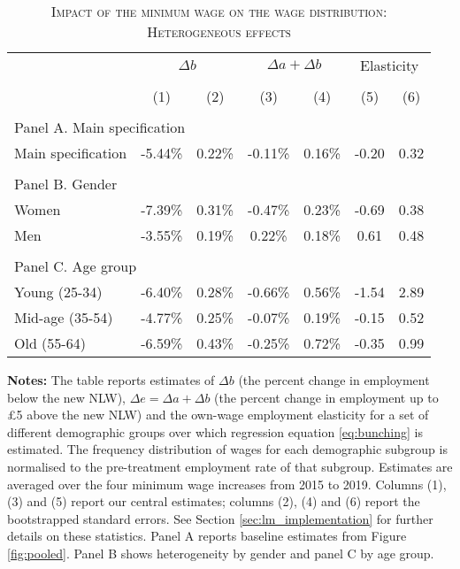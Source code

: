 \begin{table}[pth]
\centering
\small
\caption{\textsc{Impact of the minimum wage on the wage distribution: Heterogeneous effects}}
\label{tab:heterogeneity}
\begin{threeparttable}
\begin{tabular}{lcccccc}
\toprule
 & \multicolumn{2}{c}{$\Delta{b}$} & \multicolumn{2}{c}{$\Delta{a}+\Delta{b}$} & \multicolumn{2}{c}{Elasticity} \\
 &  &  &  &  &  &  \\
 & (1) & (2) & (3) & (4) & (5) & (6) \\
\midrule
& \\
\multicolumn{7}{l}{Panel A. Main specification} \\
Main specification & -5.44\% & 0.22\% & -0.11\% & 0.16\% & -0.20 & 0.32 \\
\\
\multicolumn{7}{l}{Panel B. Gender} \\
Women	&	-7.39\%	& 0.31\%	& 	-0.47\%		& 0.23\%	& 	-0.69	& 	0.38 \\
Men	&	-3.55\%		& 0.19\%	& 	0.22\%	& 	0.18\%	& 	0.61	& 	0.48 \\
\\
\multicolumn{7}{l}{Panel C. Age group} \\
Young (25-34) &	-6.40\%	& 0.28\%  &	-0.66\%	& 0.56\% &	-1.54 &	2.89 \\
Mid-age (35-54)	& -4.77\% &	0.25\%	& -0.07\% &	0.19\% &	-0.15 &	0.52 \\
Old (55-64)	& -6.59\% &	0.43\% &	-0.25\%	 & 0.72\% &	-0.35 &	0.99 \\
\bottomrule
\end{tabular}
\par
\footnotesize{\textbf{Notes:} The table reports estimates of $\Delta b$ (the percent change in employment below the new NLW), $\Delta e = \Delta a + \Delta b$ (the percent change in employment up to \pounds 5 above the new NLW) and the own-wage employment elasticity for a set of different demographic groups over which regression equation \ref{eq:bunching} is estimated. The frequency distribution of wages for each demographic subgroup is normalised to the pre-treatment employment rate of that subgroup. Estimates are averaged over the four minimum wage increases from 2015 to 2019. Columns (1), (3) and (5) report our central estimates; columns (2), (4) and (6) report the bootstrapped standard errors. See Section \ref{sec:lm_implementation} for further details on these statistics. Panel A reports baseline estimates from Figure \ref{fig:pooled}. Panel B shows heterogeneity by gender and panel C by age group.}
\end{threeparttable}
\end{table}


